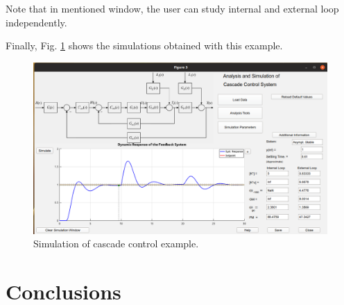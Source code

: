 Note that in mentioned window, the user can study internal and external loop independently.  

Finally, Fig. \ref{chpECA_fig07_ejemECA} shows the simulations obtained with this example.
\begin{figure}[H]
	\centering
	\includegraphics[scale=0.5]{./figuras/chapter_eca/fig07EjemECA.png}
	\caption{Simulation of cascade control example.}
	\label{chpECA_fig07_ejemECA}
\end{figure}


\section{Conclusions}



